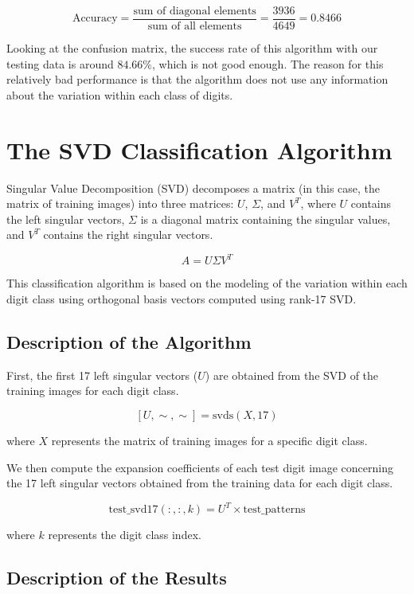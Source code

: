 \documentclass{article}
\begin{document}
\[
\text{Accuracy} = \frac{\text{sum of diagonal elements}}{\text{sum of all elements}} = \frac{3936}{4649} = 0.8466
\]

Looking at the confusion matrix, the success rate of this algorithm with our testing data is around $84.66\%$, which is not good enough. The reason for this relatively bad performance is that the algorithm does not use any information about the variation within each class of digits. 

\section{The SVD Classification Algorithm}

Singular Value Decomposition (SVD) decomposes a matrix (in this case, the matrix of training images) into three matrices: $U$, $\Sigma$, and $V^T$, where $U$ contains the left singular vectors, $\Sigma$ is a diagonal matrix containing the singular values, and $V^T$ contains the right singular vectors.

\[
A = U \Sigma V^T
\]

This classification algorithm is based on the modeling of the variation within each digit class using orthogonal basis vectors computed using rank-17 SVD. 

\subsection{Description of the Algorithm}

First, the first 17 left singular vectors ($U$) are obtained from the SVD of the training images for each digit class. 

    \[
    [U, \sim, \sim] = \text{svds}(X, 17)
    \]

where $X$ represents the matrix of training images for a specific digit class.

We then compute the expansion coefficients of each test digit image concerning the 17 left singular vectors obtained from the training data for each digit class.
    
    \[
    \text{test\_svd17}(:,:,k) = U^T \times \text{test\_patterns}
    \]
    
    where $k$ represents the digit class index.

\subsection{Description of the Results}
\end{document}
